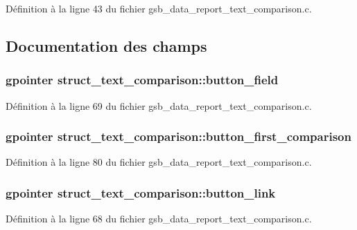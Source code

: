 Définition à la ligne 43 du fichier gsb\_\-data\_\-report\_\-text\_\-comparison.c.



\subsection{Documentation des champs}
\subsubsection[{button\_\-field}]{\setlength{\rightskip}{0pt plus 5cm}gpointer {\bf struct\_\-text\_\-comparison::button\_\-field}}\label{structstruct__text__comparison_a88f51bf6fc18737a3217b7a319b7bc35}


Définition à la ligne 69 du fichier gsb\_\-data\_\-report\_\-text\_\-comparison.c.

\subsubsection[{button\_\-first\_\-comparison}]{\setlength{\rightskip}{0pt plus 5cm}gpointer {\bf struct\_\-text\_\-comparison::button\_\-first\_\-comparison}}\label{structstruct__text__comparison_afc4ec6a3a18e2d68e03a4d562766e64b}


Définition à la ligne 80 du fichier gsb\_\-data\_\-report\_\-text\_\-comparison.c.

\subsubsection[{button\_\-link}]{\setlength{\rightskip}{0pt plus 5cm}gpointer {\bf struct\_\-text\_\-comparison::button\_\-link}}\label{structstruct__text__comparison_a86c10599cebbec73e8c4c091d4b2cad4}


Définition à la ligne 68 du fichier gsb\_\-data\_\-report\_\-text\_\-comparison.c.

